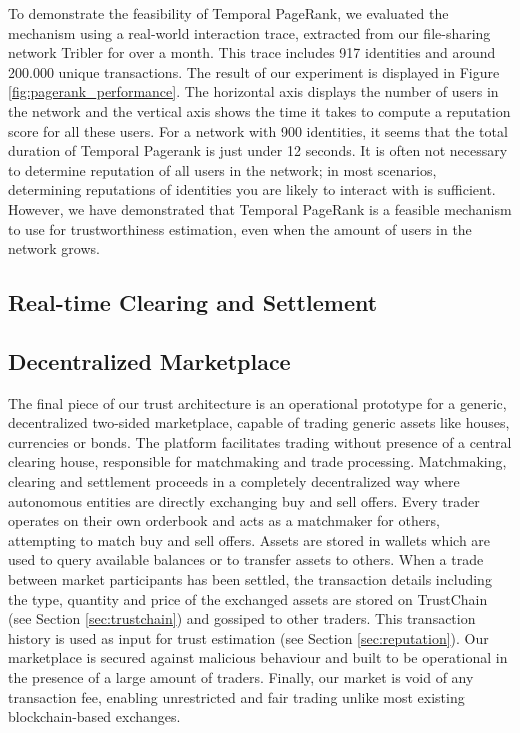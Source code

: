 \documentclass[USenglish]{article}
\begin{document}
To demonstrate the feasibility of Temporal PageRank, we evaluated the mechanism using a real-world interaction trace, extracted from our file-sharing network Tribler for over a month.
This trace includes 917 identities and around 200.000 unique transactions.
The result of our experiment is displayed in Figure \ref{fig:pagerank_performance}.
The horizontal axis displays the number of users in the network and the vertical axis shows the time it takes to compute a reputation score for all these users.
For a network with 900 identities, it seems that the total duration of Temporal Pagerank is just under 12 seconds.
It is often not necessary to determine reputation of all users in the network; in most scenarios, determining reputations of identities you are likely to interact with is sufficient.
However, we have demonstrated that Temporal PageRank is a feasible mechanism to use for trustworthiness estimation, even when the amount of users in the network grows.

\subsection{Real-time Clearing and Settlement}
\label{sec:internet_of_money}

\subsection{Decentralized Marketplace}

The final piece of our trust architecture is an operational prototype for a generic, decentralized two-sided marketplace, capable of trading generic assets like houses, currencies or bonds.
The platform facilitates trading without presence of a central clearing house, responsible for matchmaking and trade processing.
Matchmaking, clearing and settlement proceeds in a completely decentralized way where autonomous entities are directly exchanging buy and sell offers.
Every trader operates on their own orderbook and acts as a matchmaker for others, attempting to match buy and sell offers.
Assets are stored in wallets which are used to query available balances or to transfer assets to others.
When a trade between market participants has been settled, the transaction details including the type, quantity and price of the exchanged assets are stored on TrustChain (see Section \ref{sec:trustchain}) and gossiped to other traders.
This transaction history is used as input for trust estimation (see Section \ref{sec:reputation}).
Our marketplace is secured against malicious behaviour and built to be operational in the presence of a large amount of traders.
Finally, our market is void of any transaction fee, enabling unrestricted and fair trading unlike most existing blockchain-based exchanges.
\end{document}
